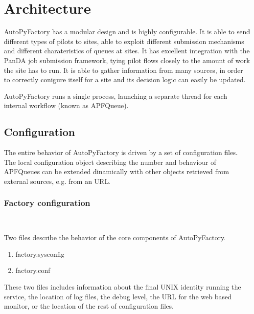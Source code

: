 \documentclass[a4paper]{jpconf}
\begin{document}
\subsection{}

\section{Architecture}


AutoPyFactory has a modular design and is highly configurable. 
It is able to send different types of pilots to sites, 
able to exploit different submission mechanisms and different charateristics of queues at sites. 
It has excellent integration with the PanDA job submission framework, 
tying pilot flows closely to the amount of work the site has to run. 
It is able to gather information from many sources, 
in order to correctly conigure itself for a site and its decision logic can easily be updated.

AutoPyFactory runs a single process,
launching a separate thread for each internal workflow (known as APFQueue).

\subsection{Configuration}

The entire behavior of AutoPyFactory is driven by a set of configuration files.
The local configuration object describing the number and behaviour of APFQueues 
can be extended dinamically with other objects retrieved from external sources, 
e.g. from an URL.

\subsubsection{Factory configuration}

~

\noindent Two files describe the behavior of the core components of AutoPyFactory.

\begin{enumerate}
\item factory.sysconfig
\item factory.conf
\end{enumerate}

These two files includes information about the final UNIX identity running the service,
the location of log files, the debug level, the URL for the web based monitor, 
or the location of the rest of configuration files.
\end{document}
